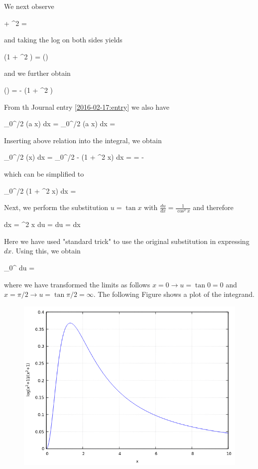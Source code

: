 We next observe

 + \tan^2 \phi= 
\eee

and taking the log on both sides yields

\bee
\ln(1 + \tan^2 \phi) = \ln()
\eee

and we further obtain

\bee
\ln(\cos \phi) = - \ln(1 + \tan^2 \phi)
\eee

From th Journal entry \ref{2016-02-17:entry} we also have 

\bee
\int_0^{\pi/2} \ln(a \sin x) dx = \int_0^{\pi/2} \ln(a \cos x) dx =  \ln {}
\eee

Inserting above relation into the integral, we obtain

\bee
\int_0^{\pi/2} \ln(\cos x) dx = \int_0^{\pi/2} - \ln(1 + \tan^2 x) dx =  \ln {} = -  
\eee

which can be simplified to

\bee
\int_0^{\pi/2} \ln(1 + \tan^2 x) dx = \pi {}
\eee

Next, we perform the substitution $u = \tan x$ with $\frac{du}{dx} = \frac{1}{\cos^2 x}$ and therefore

\bee
dx = \cos^2 x du =  du = dx
\eee

Here we have used "standard trick" to use the original substitution in expressing $dx$. Using this, we obtain

\bee
\int_0^\infty {} du = \pi {} 
\eee

where we have transformed the limits as follows $x=0 \rightarrow u = \tan 0 = 0$ and $x=\pi/2 \rightarrow u = \tan \pi/2 = \infty$. The following Figure shows a plot of the integrand.

\begin{figure}[H]
	\includegraphics[scale=0.7]{images/interesting_integrals_06_2.png}
\end{figure}


